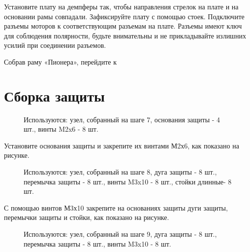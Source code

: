 \documentclass[a4paper,10pt,russian]{sphinxmanual}
\begin{document}
Установите плату на демпферы так, чтобы направления стрелок на плате и на основании рамы совпадали. Зафиксируйте плату с помощью стоек. Подключите разъемы моторов к соответствующим разъемам на плате. Разъемы имеют ключ для соблюдения полярности, будьте внимательны и не прикладывайте излишних усилий при соединении разъемов.

Собрав раму «Пионера», перейдите к {\hyperref[\detokenize{const/const_protection::doc}]{}}


\section{Сборка защиты}
\label{\detokenize{const/const_protection:id1}}\label{\detokenize{const/const_protection::doc}}

\begin{figure}[H]
\centering
\capstart

\noindent{}
\caption{Используются: узел, собранный на шаге 7, основания защиты - 4 шт., винты M2x6 - 8 шт.}\label{\detokenize{const/const_protection:id2}}\end{figure}

Установите основания защиты и закрепите их винтами М2х6, как показано на рисунке.


\begin{figure}[H]
\centering
\capstart

\noindent{}
\caption{Используются: узел, собранный на шаге 8, дуга защиты - 8 шт., перемычка защиты - 8 шт., винты M3x10 - 8 шт., стойки длинные- 8 шт.}\label{\detokenize{const/const_protection:id3}}\end{figure}

С помощью винтов М3х10 закрепите на основаниях защиты дуги защиты, перемычки защиты и стойки, как показано на рисунке.


\begin{figure}[H]
\centering
\capstart

\noindent{}
\caption{Используются: узел, собранный на шаге 9, дуга защиты - 8 шт., перемычка защиты - 8 шт., винты M3x10 - 8 шт.}\label{\detokenize{const/const_protection:id4}}\end{figure}
\end{document}
